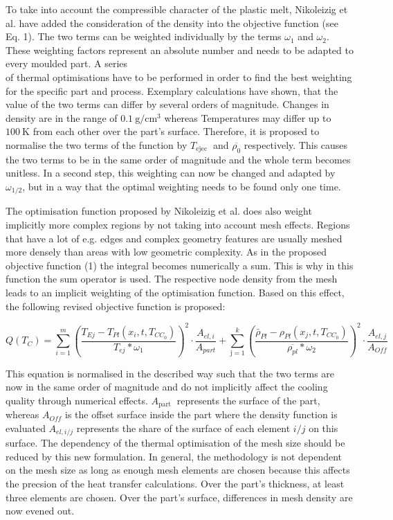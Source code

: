 \documentclass[10pt]{article}
\begin{document}
To take into account the compressible character of the plastic melt, Nikoleizig et al. have added the consideration of the density into the objective function (see Eq. 1). The two terms can be weighted individually by the terms $\omega_{1}$ and $\omega_{2}$. These weighting factors represent an absolute number and needs to be adapted to every moulded part. A series\\
of thermal optimisations have to be performed in order to find the best weighting for the specific part and process. Exemplary calculations have shown, that the value of the two terms can differ by several orders of magnitude. Changes in density are in the range of $0.1 \mathrm{~g} / \mathrm{cm}^{3}$ whereas Temperatures may differ up to $100 \mathrm{~K}$ from each other over the part's surface. Therefore, it is proposed to normalise the two terms of the function by $T_{\text {ejec }}$ and $\overline{\rho_{0}}$ respectively. This causes the two terms to be in the same order of magnitude and the whole term becomes unitless. In a second step, this weighting can now be changed and adapted by $\omega_{1 / 2}$, but in a way that the optimal weighting needs to be found only one time.

The optimisation function proposed by Nikoleizig et al. does also weight implicitly more complex regions by not taking into account mesh effects. Regions that have a lot of e.g. edges and complex geometry features are usually meshed more densely than areas with low geometric complexity. As in the proposed objective function (1) the integral becomes numerically a sum. This is why in this function the sum operator is used. The respective node density from the mesh leads to an implicit weighting of the optimisation function. Based on this effect, the following revised objective function is proposed:


\begin{equation*}
Q\left(T_{C}\right)=\sum_{i=1}^{m}\left(\frac{T_{E j}-T_{P l}\left(x_{i}, t, T_{C C_{0}}\right)}{T_{e j} * \omega_{1}}\right)^{2} \cdot \frac{A_{e l, i}}{A_{p a r t}}+\sum_{\mathrm{j}=1}^{k}\left(\frac{\bar{\rho}_{P l}-\rho_{P l}\left(x_{j}, t, T_{C C_{0}}\right)}{\overline{\rho_{p l}} * \omega_{2}}\right)^{2} \cdot \frac{A_{e l, j}}{A_{O f f}} \tag{2}
\end{equation*}


This equation is normalised in the described way such that the two terms are now in the same order of magnitude and do not implicitly affect the cooling quality through numerical effects. $A_{\text {part }}$ represents the surface of the part, whereas $A_{O f f}$ is the offset surface inside the part where the density function is evaluated $A_{e l, i / j}$ represents the share of the surface of each element $i / j$ on this surface. The dependency of the thermal optimisation of the mesh size should be reduced by this new formulation. In general, the methodology is not dependent on the mesh size as long as enough mesh elements are chosen because this affects the precsion of the heat transfer calculations. Over the part's thickness, at least three elements are chosen. Over the part's surface, differences in mesh density are now evened out.
\end{document}
